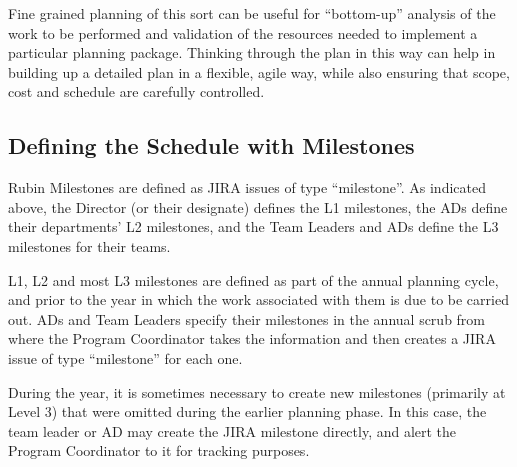 Fine grained planning of this sort can be useful for ``bottom-up''
analysis of the work to be performed and validation of the resources
needed to implement a particular planning package. Thinking through the
plan in this way can help in building up a detailed plan in a flexible,
agile way, while also ensuring that scope, cost and schedule are
carefully controlled.


\subsection{Defining the Schedule with Milestones}

Rubin Milestones are defined as \gls{JIRA} issues of type ``milestone''. As indicated above, the \gls{Director} (or their designate) defines the L1 milestones, the \glspl{AD} define their departments' L2 milestones, and the Team Leaders and \glspl{AD} define the L3 milestones for their teams.

L1, L2 and most L3 milestones are defined as part of the annual planning \gls{cycle}, and prior to the year in which the work associated with them is due to be carried out. \glspl{AD} and Team Leaders specify their milestones in the annual scrub from where the Program Coordinator takes the information and then creates a \gls{JIRA} issue of type ``milestone'' for each one.

During the year, it is sometimes necessary to create new milestones (primarily at Level 3) that were omitted during the earlier planning phase. In this case, the team leader or \gls{AD} may create the \gls{JIRA} milestone directly, and alert the Program Coordinator to it for tracking purposes.

